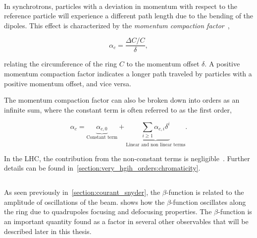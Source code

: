 \FloatBarrier

\paragraph{}
\label{subsection:coordinates_systems:momentum_compaction_factor}

In synchrotrons, particles with a deviation in momentum with respect to the reference particle will
experience a different path length due to the bending of the dipoles. This effect is characterized
by the \textit{momentum compaction factor}~\cite{wiedemann_particle_2015},

\begin{equation}
    \alpha_c = \frac{\Delta C / C}{\delta},
\end{equation}

relating the circumference of the ring $C$ to the momentum offset $\delta$.
A positive momentum compaction factor indicates a longer path traveled by particles with a positive
momentum offset, and vice versa.


The momentum compaction factor can also be broken down into orders as an infinite sum, where the
constant term is often referred to as the first order,

\begin{equation}
    \alpha_c = \underbrace{\alpha_{c,0}}_{\text{Constant term}}
               + \underbrace{\sum_{i \geq 1} \alpha_{c, i} \delta^i}_\text{Linear and non linear terms}.
\end{equation}

In the LHC, the contribution from the non-constant terms is
negligible~\cite{keintzel_jacqueline_beam_2022}. Further details can be found
in~\cref{section:very_hgih_orders:chromaticity}.

\FloatBarrier

\subsection{}

As seen previously in~\cref{section:courant_snyder}, the $\beta$-function is related to the amplitude
of oscillations of the beam.  shows how the $\beta$-function
oscillates along the ring due to quadrupoles focusing and defocusing properties.
The $\beta$-function is an important quantity found as a factor in several other observables that
will be described later in this thesis.



